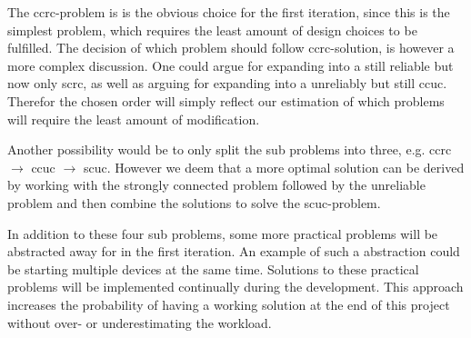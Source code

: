 \bigskip \noindent
The \gls{ccrc}-problem is is the obvious choice for the first iteration, since this is the simplest problem, which requires the least amount of design choices to be fulfilled.
The decision of which problem should follow \gls{ccrc}-solution, is however a more complex discussion.
One could argue for expanding into a still reliable but now only \acrlong{scrc}, as well as arguing for expanding into a unreliably but still \acrlong{ccuc}.
Therefor the chosen order will simply reflect our estimation of which problems will require the least amount of modification.

Another possibility would be to only split the sub problems into three, e.g. \gls{ccrc} $\rightarrow$ \gls{ccuc} $\rightarrow$ \gls{scuc}.
However we deem that a more optimal solution can be derived by working with the strongly connected problem followed by the unreliable problem and then combine the solutions to solve the \gls{scuc}-problem.

In addition to these four sub problems, some more practical problems will be abstracted away for in the first iteration.
An example of such a abstraction could be starting multiple devices at the same time.
Solutions to these practical problems will be implemented continually during the development. 
This approach increases the probability of having a working solution at the end of this project without over- or underestimating the workload. 
